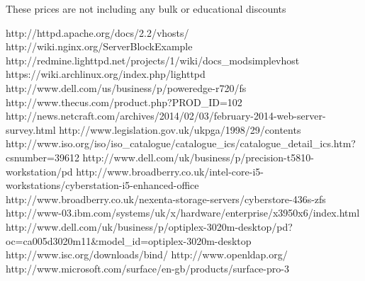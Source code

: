 \documentclass[10pt]{article}
\begin{document}
            These prices are not including any bulk or educational discounts

    \clearpage
    \begin{thebibliography}{9}
            http://httpd.apache.org/docs/2.2/vhosts/
            http://wiki.nginx.org/ServerBlockExample
            http://redmine.lighttpd.net/projects/1/wiki/docs\_modsimplevhost
            https://wiki.archlinux.org/index.php/lighttpd
            http://www.dell.com/us/business/p/poweredge-r720/fs
            http://www.thecus.com/product.php?PROD\_ID=102
            http://news.netcraft.com/archives/2014/02/03/february-2014-web-server-survey.html
            http://www.legislation.gov.uk/ukpga/1998/29/contents
            http://www.iso.org/iso/iso\_catalogue/catalogue\_ics/catalogue\_detail\_ics.htm?csnumber=39612
            http://www.dell.com/uk/business/p/precision-t5810-workstation/pd
            http://www.broadberry.co.uk/intel-core-i5-workstations/cyberstation-i5-enhanced-office
            http://www.broadberry.co.uk/nexenta-storage-servers/cyberstore-436s-zfs
            http://www-03.ibm.com/systems/uk/x/hardware/enterprise/x3950x6/index.html
            http://www.dell.com/uk/business/p/optiplex-3020m-desktop/pd?oc=ca005d3020m11\&model\_id=optiplex-3020m-desktop
            http://www.isc.org/downloads/bind/
            http://www.openldap.org/
            http://www.microsoft.com/surface/en-gb/products/surface-pro-3
    \end{thebibliography}
\end{document}
